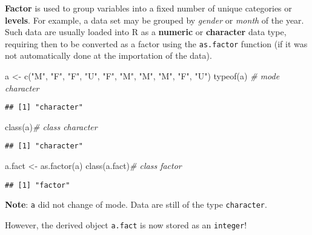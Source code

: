 \documentclass[
]{article}
\newenvironment{Shaded}{\begin{snugshade}}{\end{snugshade}}
\newcommand{\CommentTok}[1]{\textcolor[rgb]{0.56,0.35,0.01}{\textit{#1}}}
\newcommand{\FunctionTok}[1]{\textcolor[rgb]{0.00,0.00,0.00}{#1}}
\newcommand{\NormalTok}[1]{#1}
\newcommand{\OtherTok}[1]{\textcolor[rgb]{0.56,0.35,0.01}{#1}}
\newcommand{\StringTok}[1]{\textcolor[rgb]{0.31,0.60,0.02}{#1}}
\begin{document}
\textbf{Factor} is used to group variables into a fixed number of unique
categories or \textbf{levels}. For example, a data set may be grouped by
\emph{gender} or \emph{month} of the year. Such data are usually loaded
into R as a \textbf{numeric} or \textbf{character} data type, requiring
then to be converted as a factor using the \texttt{as.factor} function
(if it was not automatically done at the importation of the data).

\begin{Shaded}
\begin{Highlighting}[]
\NormalTok{a }\OtherTok{\textless{}{-}} \FunctionTok{c}\NormalTok{(}\StringTok{"M"}\NormalTok{, }\StringTok{"F"}\NormalTok{, }\StringTok{"F"}\NormalTok{, }\StringTok{"U"}\NormalTok{, }\StringTok{"F"}\NormalTok{, }\StringTok{"M"}\NormalTok{, }\StringTok{"M"}\NormalTok{, }\StringTok{"M"}\NormalTok{, }\StringTok{"F"}\NormalTok{, }\StringTok{"U"}\NormalTok{)}
\FunctionTok{typeof}\NormalTok{(a) }\CommentTok{\# mode character}
\end{Highlighting}
\end{Shaded}

\begin{verbatim}
## [1] "character"
\end{verbatim}

\begin{Shaded}
\begin{Highlighting}[]
\FunctionTok{class}\NormalTok{(a)}\CommentTok{\# class character}
\end{Highlighting}
\end{Shaded}

\begin{verbatim}
## [1] "character"
\end{verbatim}

\begin{Shaded}
\begin{Highlighting}[]
\NormalTok{a.fact }\OtherTok{\textless{}{-}} \FunctionTok{as.factor}\NormalTok{(a)}
\FunctionTok{class}\NormalTok{(a.fact)}\CommentTok{\# class factor}
\end{Highlighting}
\end{Shaded}

\begin{verbatim}
## [1] "factor"
\end{verbatim}

\textbf{Note}: \texttt{a} did not change of mode. Data are still of the
type \texttt{character}.

However, the derived object \texttt{a.fact} is now stored as an
\texttt{integer}!
\end{document}

